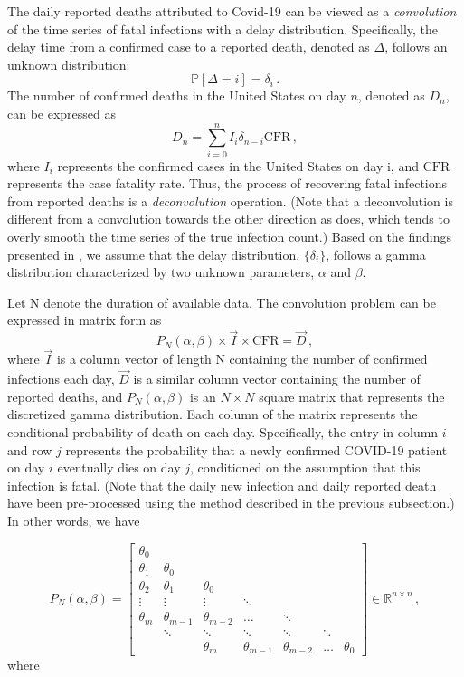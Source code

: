 \documentclass[sn-mathphys,Numbered]{sn-jnl}
\begin{document}
The daily reported deaths attributed to Covid-19 can be viewed as a \textit{convolution} of the time series of fatal infections with a delay distribution. Specifically, the delay time from a confirmed case to a reported death, denoted as $\Delta$, follows an unknown distribution: $$  \mathbb{P}[\Delta = i] = \delta_{i} \,.$$
The number of confirmed deaths in the United States on day $n$, denoted as $D_{n}$, can be expressed as 
$$  D_{n} = \sum_{i = 0}^{n} I_{i} \delta_{n-i} \mbox{CFR} \,,$$ 
where $I_i$ represents the confirmed cases in the United States on day i, and $\mbox{CFR}$ represents the case fatality rate. Thus, the process of recovering fatal infections from reported deaths is a \textit{deconvolution} operation. (Note that a deconvolution is different from a convolution towards the other direction as \cite{TrueInfection2} does, which tends to overly smooth the time series of the true infection count.) Based on the findings presented in \cite{flaxman2020report, TrueInfection2}, we assume that the delay distribution, $\{ \delta_{i}\}$, follows a gamma distribution characterized by two unknown parameters, $\alpha$ and $\beta$.

Let N denote the duration of available data. The convolution problem can be expressed in matrix form as
\begin{equation}
    P_{N}(\alpha, \beta) \times \vec{I} \times \mbox{CFR} = \vec{D} \,,
\end{equation}
where $\vec{I}$ is a column vector of length N containing the number of confirmed infections each day, $\vec{D}$ is a similar column vector containing the number of reported deaths, and $P_N(\alpha, \beta)$ is an $N \times N$ square matrix that represents the discretized gamma distribution. Each column of the matrix represents the conditional probability of death on each day. Specifically, the entry in column $i$ and row $j$ represents the probability that a newly confirmed COVID-19 patient on day $i$ eventually dies on day $j$, conditioned on the assumption that this infection is fatal. (Note that the daily new infection and daily reported death have been pre-processed using the method described in the previous subsection.) In other words, we have 

    \[
        P_{N}(\alpha, \beta) = 
        \begin{bmatrix}
            \theta_0  \\
            \theta_1 & \theta_0  \\ 
            \theta_2 & \theta_1      & \theta_0\\
            \vdots   & \vdots        & \vdots        & \ddots\\
            \theta_m & \theta_{m-1}  & \theta_{m-2}  & \dots     & \ddots\\
                     & \ddots        & \ddots        & \ddots     & \ddots     & \ddots \\
                     &               &  \theta_m &  \theta_{m-1} &     \theta_{m-2} & \dots  & \theta_0
                    
        \end{bmatrix} \in \mathbb{R}^{n \times n} \,,
    \]
    where
    
\end{document}
